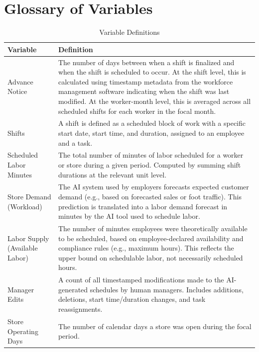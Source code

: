 \documentclass[letterpaper,11pt,leqno]{article}
\theoremstyle{paper}
\begin{document}
\section{Glossary of Variables} \label{sec:glossary_of_variables}

\begin{table}[H]
\scriptsize
\singlespacing
\centering
\caption{Variable Definitions}
\begin{tabular}{p{5cm}p{11cm}}
\toprule
\textbf{Variable} & \textbf{Definition} \\
\midrule
Advance Notice & The number of days between when a shift is finalized and when the shift is scheduled to occur. At the shift level, this is calculated using timestamp metadata from the workforce management software indicating when the shift was last modified. At the worker-month level, this is averaged across all scheduled shifts for each worker in the focal month. \\

Shifts & A shift is defined as a scheduled block of work with a specific start date, start time, and duration, assigned to an employee and a task.  \\

Scheduled Labor Minutes & The total number of minutes of labor scheduled for a worker or store during a given period. Computed by summing shift durations at the relevant unit level. \\

Store Demand (Workload) & The AI system used by employers forecasts expected customer demand (e.g., based on forecasted sales or foot traffic). This prediction is translated into a labor demand forecast in minutes by the AI tool used to schedule labor. \\[6pt]

Labor Supply (Available Labor) & The number of minutes employees were theoretically available to be scheduled, based on employee-declared availability and compliance rules (e.g., maximum hours). This reflects the upper bound on schedulable labor, not necessarily scheduled hours. \\

Manager Edits & A count of all timestamped modifications made to the AI-generated schedules by human managers. Includes additions, deletions, start time/duration changes, and task reassignments. \\

Store Operating Days & The number of calendar days a store was open during the focal period. \\[6pt]


\end{tabular}
\end{table}
\end{document}
